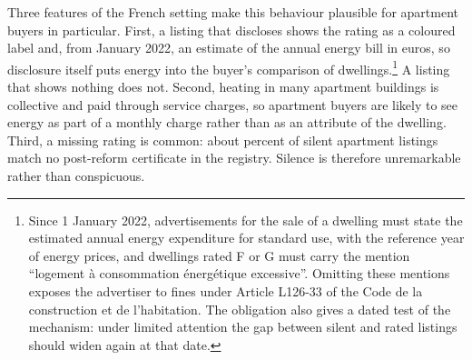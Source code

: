 Three features of the French setting make this behaviour plausible for apartment buyers in particular. First, a listing that discloses shows the rating as a coloured label and, from January 2022, an estimate of the annual energy bill in euros, so disclosure itself puts energy into the buyer's comparison of dwellings.\footnote{Since 1 January 2022, advertisements for the sale of a dwelling must state the estimated annual energy expenditure for standard use, with the reference year of energy prices, and dwellings rated F or G must carry the mention ``logement \`a consommation \'energ\'etique excessive''. Omitting these mentions exposes the advertiser to fines under Article L126-33 of the Code de la construction et de l'habitation. %
The obligation also gives a dated test of the mechanism: under limited attention the gap between silent and rated listings should widen again at that date.} A listing that shows nothing does not. Second, heating in many apartment buildings is collective and paid through service charges, so apartment buyers are likely to see energy as part of a monthly charge rather than as an attribute of the dwelling. Third, a missing rating is common: about \attShareUninfApt{} percent of silent apartment listings match no post-reform certificate in the registry. Silence is therefore unremarkable rather than conspicuous.
